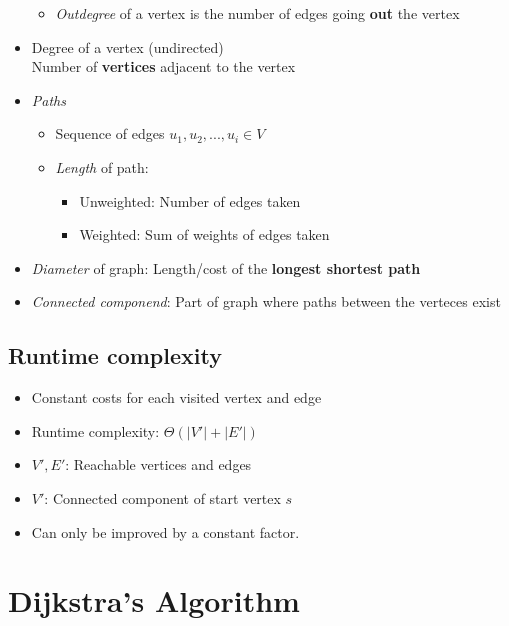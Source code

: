 \documentclass[12pt, a4paper]{scrartcl}
\begin{document}
\begin{itemize}
\begin{itemize}
  \item \emph{Outdegree} of a vertex is the number of edges going \textbf{out} the vertex
  \end{itemize}
\item Degree of a vertex (undirected)\\
  Number of \textbf{vertices} adjacent to the vertex
\item \emph{Paths}
  \begin{itemize}
  \item Sequence of edges $u_1,u_2,...,u_i\in V$
  \item \emph{Length} of path:
    \begin{itemize}
    \item Unweighted: Number of edges taken
    \item Weighted: Sum of weights of edges taken
    \end{itemize}
  \end{itemize}
\item \emph{Diameter} of graph: Length/cost of the \textbf{longest shortest path}
\item \emph{Connected componend}: Part of graph where paths between the verteces exist
\end{itemize}

\subsection{Runtime complexity}
\begin{itemize}
\item Constant costs for each visited vertex and edge
\item Runtime complexity: $\Theta(|V'|+|E'|)$
\item $V',E'$: Reachable vertices and edges
\item $V'$: Connected component of start vertex $s$
\item Can only be improved by a constant factor.
\end{itemize}

\section{Dijkstra's Algorithm}
\label{sec:O-notation}
\end{document}
